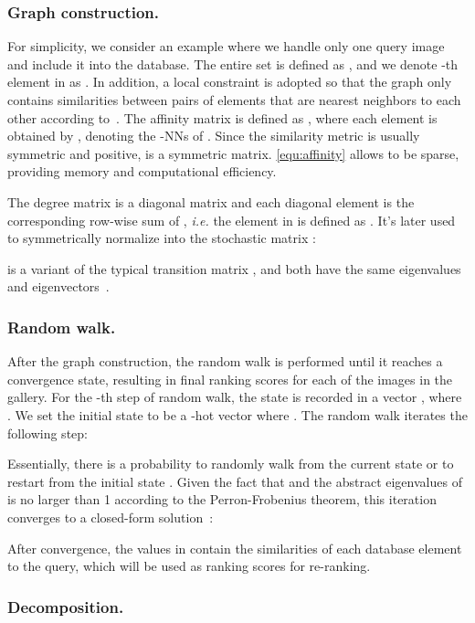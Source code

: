 \documentclass[letterpaper]{article} \usepackage{aaai19}  \usepackage{times}  \usepackage{helvet}  \usepackage{courier}  \usepackage{url}  \usepackage{graphicx}  \frenchspacing  \setlength{\pdfpagewidth}{8.5in}  \setlength{\pdfpageheight}{11in}
\begin{document}
\subsubsection{Graph construction.}
\label{sec:graph_construction}
For simplicity, we consider an example where we handle only one query image  and include it into the database.
The entire set is defined as , and we denote -th element in  as .
In addition, a local constraint is adopted so that the graph only contains similarities between pairs of elements that are nearest neighbors to each other according to~\cite{iscen2017efficient}.
The affinity matrix is defined as , where each element is obtained by
, denoting  the -NNs of .
Since the similarity metric  is usually symmetric and positive,  is a symmetric matrix.
\cref{equ:affinity} allows  to be sparse, providing memory and computational efficiency.

The degree matrix  is a diagonal matrix and each diagonal element is the corresponding row-wise sum of , \emph{i.e.} the element  in  is defined as .
It's later used to symmetrically normalize  into the stochastic matrix :

 is a variant of the typical transition matrix , and both have the same eigenvalues and eigenvectors~\cite{donoser2013diffusion}.

\subsubsection{Random walk.}
After the graph construction, the random walk is performed until it reaches a convergence state, resulting in final ranking scores for each of the images in the gallery.
For the -th step of random walk, the state is recorded in a vector , where .
We set the initial state to be a -hot vector where .
The random walk iterates the following step:

Essentially, there is a probability  to randomly walk from the current state  or  to restart from the initial state .
Given the fact that  and the abstract eigenvalues of  is no larger than 1 according to the Perron-Frobenius theorem, this iteration converges to a closed-form solution~\cite{zhou2004ranking}:

After convergence, the values in  contain the similarities of each database element to the query, which will be used as ranking scores for re-ranking.


\subsubsection{Decomposition.}
\end{document}
